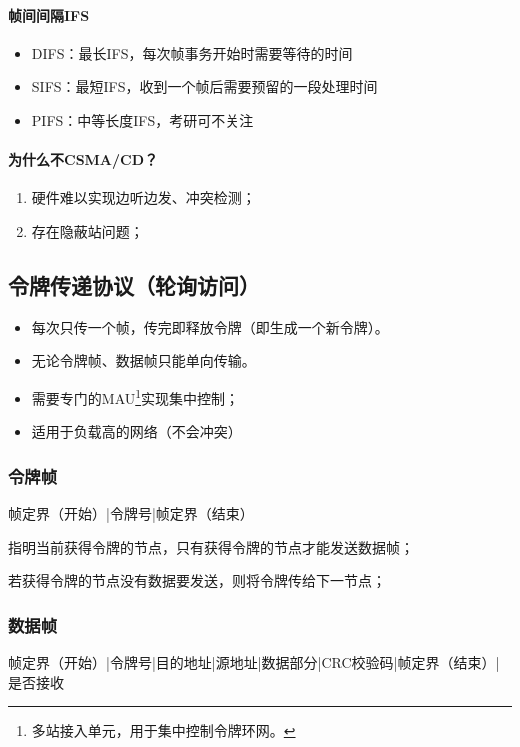 \paragraph{帧间间隔IFS}
\begin{itemize}
    \item DIFS：最长IFS，每次帧事务开始时需要等待的时间
    \item SIFS：最短IFS，收到一个帧后需要预留的一段处理时间
    \item PIFS：中等长度IFS，考研可不关注
\end{itemize}


\paragraph{为什么不CSMA/CD？}
\begin{enumerate}
    \item 硬件难以实现边听边发、冲突检测；
    \item 存在隐蔽站问题；
\end{enumerate}


\subsection{令牌传递协议（轮询访问）}
\begin{itemize}
    \item 每次只传一个帧，传完即释放令牌（即生成一个新令牌）。
    \item 无论令牌帧、数据帧只能单向传输。
    \item 需要专门的MAU\footnote{多站接入单元，用于集中控制令牌环网。}实现集中控制；
    \item 适用于负载高的网络（不会冲突）
\end{itemize}


\subsubsection{令牌帧}
帧定界（开始）|令牌号|帧定界（结束）

指明当前获得令牌的节点，只有获得令牌的节点才能发送数据帧；

若获得令牌的节点没有数据要发送，则将令牌传给下一节点；


\subsubsection{数据帧}
帧定界（开始）|令牌号|目的地址|源地址|数据部分|CRC校验码|帧定界（结束）|是否接收

